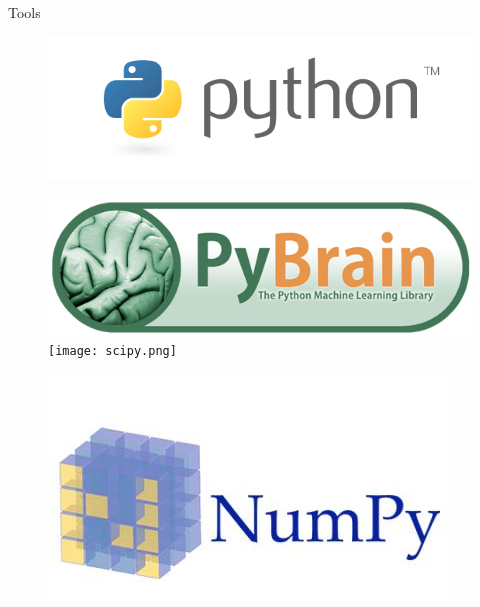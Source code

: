 \documentclass[xcolor=x11names,compress]{beamer}
\renewcommand{\(}{\begin{columns}}
\renewcommand{\)}{\end{columns}}
\newcommand{\<}[1]{\begin{column}{#1}}
\renewcommand{\>}{\end{column}}
\begin{document}
\begin{frame}{Tools}
\begin{itemize}
{\begin{figure}[!htb]
                      \includegraphics[width=\linewidth]{python.png}
                    \endminipage\hfill

                      \includegraphics[width=\linewidth]{pybrain.png}
                    \endminipage\hfill
                      \texttt{[image: scipy.png]}
                    \endminipage

                      \includegraphics[width=\linewidth]{numpy.jpg}
                    \endminipage\hfill

                    \end{figure}			
			}
	\end{itemize}
\end{frame}
\end{document}
